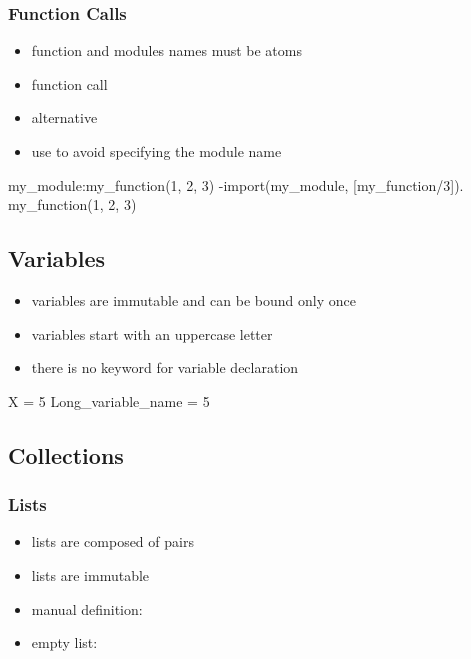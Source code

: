 \documentclass[a4paper,landscape,10pt]{article}
\begin{document}
\begin{multicols*}{2}
  \breakcolumn

  \subsubsection{Function Calls}

  \begin{itemize}
    \item function and modules names must be atoms
    \item function call 
    \item alternative 
    \item use  to avoid specifying the module name
  \end{itemize}

  \begin{erlang}
my_module:my_function(1, 2, 3) %
-import(my_module, [my_function/3]).
my_function(1, 2, 3) %
\end{erlang}

  \subsection{Variables}

  \begin{itemize}
    \item variables are immutable and can be bound only once
    \item variables start with an uppercase letter
    \item there is no keyword for variable declaration
  \end{itemize}

  \begin{erlang}
X = 5 %
Long_variable_name = 5 %
\end{erlang}

  \subsection{Collections}

  \subsubsection{Lists}

  \begin{itemize}
    \item lists are composed of pairs
    \item lists are immutable
    \item manual definition: \ierlang{[1, 2, 3]}
    \item empty list: \ierlang{[]}
  \end{itemize}


\end{multicols*}
\end{document}
